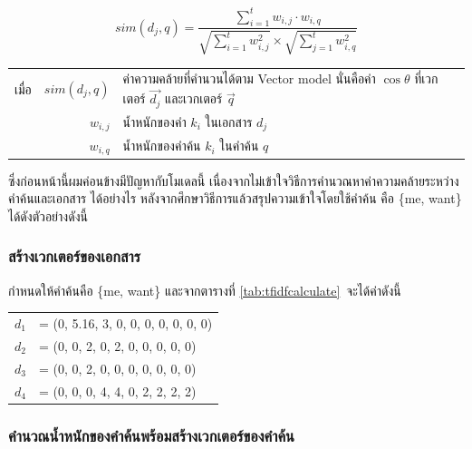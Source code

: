 \documentclass[11pt,a4paper]{article}
\begin{document}
{{{\begin{equation}
    sim(d_{j},q) = \frac{\sum_{i=1}^{t}{w_{i,j} \cdot w_{i,q}}}{\sqrt{\sum_{i=1}^{t}{w^2_{i,j}}} \times \sqrt{\sum_{j=1}^{t}{w^2_{i,q}}}}
\end{equation}

\begin{table}[ht!]
    \begin{tabular}{lrl}
        เมื่อ & $sim(d_{j}, q)$   & ค่าความคล้ายที่คำนวนได้ตาม Vector model นั่นคือค่า $\cos \theta$ ที่เวกเตอร์ $\overrightarrow{d_j}$ และเวกเตอร์ $\overrightarrow{q}$ \\
            & $w_{i,j}$         & น้ำหนักของคำ $k_i$ ในเอกสาร $d_j$ \\
            & $w_{i,q}$         & น้ำหนักของคำค้น $k_i$ ในคำค้น $q$ 
    \end{tabular}
\end{table}

ซึ่งก่อนหน้านี้ผมค่อนข้างมีปัญหากับโมเดลนี้ เนื่องจากไม่เข้าใจวิธีการคำนวณหาค่าความคล้ายระหว่างคำค้นและเอกสาร ได้อย่างไร หลังจากศึกษาวิธีการแล้วสรุปความเข้าใจโดยใช้คำค้น 
คือ \{me, want\} ได้ดังตัวอย่างดังนี้

\subsubsection{สร้างเวกเตอร์ของเอกสาร}

กำหนดให้คำค้นคือ \{me, want\} และจากตารางที่ \ref{tab:tfidfcalculate}\ จะได้ค่าดังนี้

\begin{table}[ht!]
    \centering
    \begin{tabular}{cl} 
        $d_1$   & = (0, 5.16, 3, 0, 0, 0, 0, 0, 0, 0)  \\
        $d_2$   & = (0,    0, 2, 0, 2, 0, 0, 0, 0, 0) \\
        $d_3$   & = (0,    0, 2, 0, 0, 0, 0, 0, 0, 0)  \\
        $d_4$   & = (0,    0, 0, 4, 4, 0, 2, 2, 2, 2)  \\
    \end{tabular}
    \label{tab:inputvector}
\end{table}

\subsubsection{คำนวณน้ำหนักของคำค้นพร้อมสร้างเวกเตอร์ของคำค้น}

}}}
\end{document}
